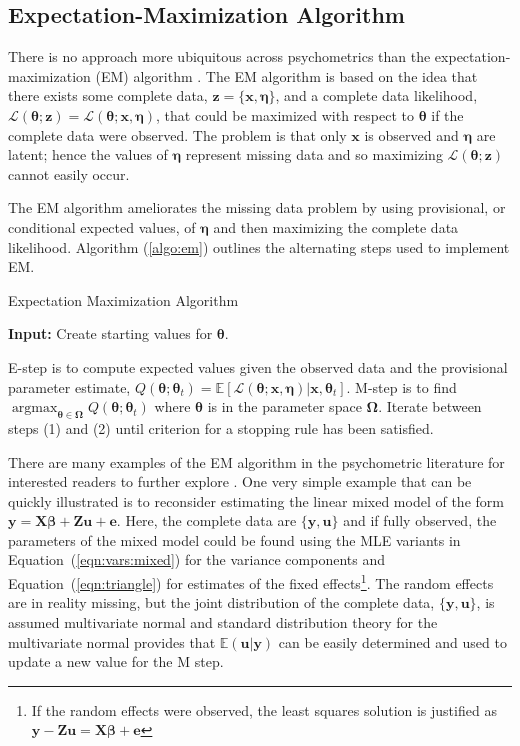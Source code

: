 \documentclass[12pt]{article}
\DeclareMathOperator*{\argmax}{argmax}
\begin{document}
\subsection*{Expectation-Maximization Algorithm}

There is no approach more ubiquitous across psychometrics than the expectation-maximization (EM) algorithm \cite{dempster}. The EM algorithm is based on the idea that there exists some complete data, $\bm{z} = \{\bm{x}, \bm{\eta}\}$, and a complete data likelihood, $\mathcal{L}(\bm{\theta};\bm{z}) = \mathcal{L}(\bm{\theta};\bm{x},\bm{\eta})$, that could be maximized with respect to $\bm{\theta}$ if the complete data were observed. The problem is that only $\bm{x}$ is observed and $\bm{\eta}$ are latent; hence the values of $\bm{\eta}$ represent missing data and so maximizing $\mathcal{L}(\bm{\theta};\bm{z})$ cannot easily occur. 

The EM algorithm ameliorates the missing data problem by using provisional, or conditional expected values, of $\bm{\eta}$ and then maximizing the complete data likelihood. Algorithm (\ref{algo:em}) outlines the alternating steps used to implement EM.

\begin{algorithm}
\caption{Expectation Maximization Algorithm}
\label{algo:em}
	\hspace*{\algorithmicindent} \textbf{Input:} Create starting values for $\bm{\theta}$.
\begin{algorithmic}[1]
	\State E-step is to compute expected values given the observed data and the provisional parameter estimate, $Q(\bm{\theta};\bm{\theta}_t) = \mathbb{E}[\mathcal{L}(\bm{\theta};\bm{x},\bm{\eta})|\bm{x},\bm{\theta}_t]$.
	\State M-step is to find $\argmax_{\bm{\theta} \in \bm{\Omega}} Q(\bm{\theta};\bm{\theta}_t)$ where $\bm{\theta}$ is in the parameter space $\bm{\Omega}$.
	\State Iterate between steps (1) and (2) until criterion for a stopping rule has been satisfied. 
\end{algorithmic}
\end{algorithm}

There are many examples of the EM algorithm in the psychometric literature for interested readers to further explore \cite{Hsu1999TheRB}. One very simple example that can be quickly illustrated is to reconsider estimating the linear mixed model of the form $\bm{y} = \bm{X}\bm{\beta} + \bm{Z}\bm{u} + \bm{e}$. Here, the complete data are $\{\bm{y}, \bm{u}\}$ and if fully observed, the parameters of the mixed model could be found using the MLE variants in Equation~(\ref{eqn:vars:mixed}) for the variance components and Equation~(\ref{eqn:triangle}) for estimates of the fixed effects\footnote{If the random effects were observed, the least squares solution is justified as $\bm{y} -\bm{Z}\bm{u} = \bm{X}\bm{\beta} + \bm{e}$}. The random effects are in reality missing, but the joint distribution of the complete data, $\{\bm{y}, \bm{u}\}$, is assumed multivariate normal and standard distribution theory for the multivariate normal provides that $\mathbb{E}(\bm{u}|\bm{y})$ can be easily determined \cite{mcandsearle:2001} and used to update a new value for the M step.  
\end{document}
